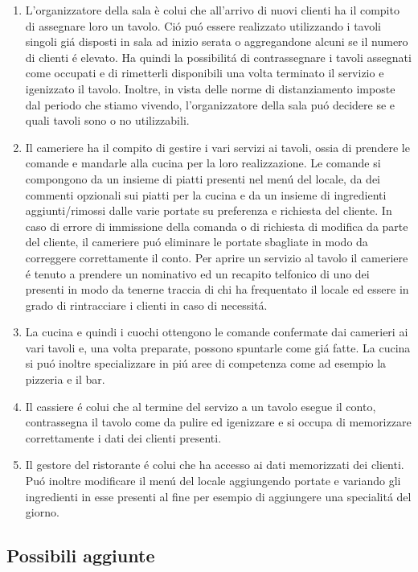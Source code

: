 \documentclass{article}
\begin{document}
\begin{enumerate}
\item L'organizzatore della sala è colui che all'arrivo di nuovi clienti ha il compito di assegnare loro un tavolo. Ci\'o pu\'o essere realizzato utilizzando i tavoli singoli gi\'a disposti in sala ad inizio serata o aggregandone alcuni se il numero di clienti \'e  elevato. Ha quindi la possibilit\'a di contrassegnare i tavoli assegnati come occupati e di rimetterli disponibili una volta terminato il servizio e igenizzato il tavolo. Inoltre, in vista delle norme di distanziamento imposte dal periodo che stiamo vivendo, l'organizzatore della sala pu\'o decidere se e quali tavoli sono o no utilizzabili. 
\item Il cameriere ha il compito di gestire i vari servizi ai tavoli, ossia di prendere le comande e mandarle alla cucina per la loro realizzazione. Le comande si compongono da un insieme di piatti presenti nel men\'u del locale, da dei commenti opzionali sui piatti per la cucina e da un insieme di ingredienti aggiunti/rimossi dalle varie portate su preferenza e richiesta del cliente. In caso di  errore di immissione della comanda o di richiesta di modifica da parte del cliente, il cameriere pu\'o eliminare le portate sbagliate in modo da correggere correttamente il conto. Per aprire un servizio al tavolo il cameriere \'e tenuto a prendere un nominativo ed un recapito telfonico di uno dei presenti in modo da tenerne traccia di chi ha frequentato il locale ed essere in grado di rintracciare i clienti in caso di necessit\'a. 
\item La cucina e quindi i cuochi ottengono le comande confermate dai camerieri ai vari tavoli e, una volta preparate, possono spuntarle come gi\'a fatte. La cucina si pu\'o inoltre specializzare in pi\'u aree di competenza come ad esempio la pizzeria e il bar. 
\item Il cassiere \'e colui che al termine del servizo a un tavolo esegue il conto, contrassegna il tavolo come da pulire ed igenizzare e si occupa di memorizzare correttamente i dati dei clienti presenti.
\item Il gestore del ristorante \'e colui che ha accesso ai dati memorizzati dei clienti. Pu\'o inoltre modificare il men\'u del locale aggiungendo portate e variando gli ingredienti in esse presenti al fine per esempio di aggiungere una specialit\'a del giorno.
\end{enumerate}

\subsection{Possibili aggiunte}
\end{document}
